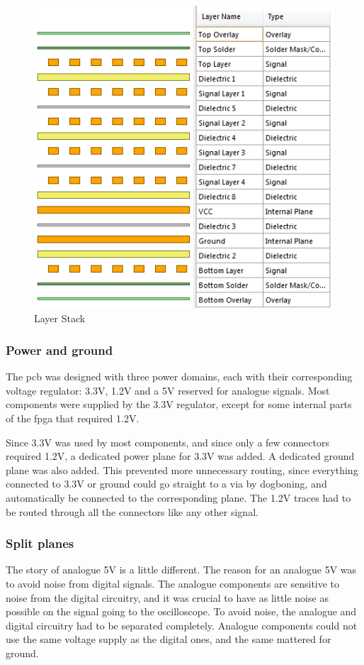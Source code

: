 \begin{figure}[h!]
\centering
\includegraphics[scale = 0.8]{images/Layers.png}
\caption{Layer Stack}
\label{fig:Layers}
\end{figure}

\subsubsection{Power and ground}
\label{Power}
The \gls{pcb} was designed with three power domains, each with their corresponding voltage regulator: 3.3V, 1.2V and a 5V reserved for analogue signals.
Most components were supplied by the 3.3V regulator, except for some internal parts of the \gls{fpga} that required 1.2V.

Since 3.3V was used by most components, and since only a few connectors required 1.2V, a dedicated power plane for 3.3V was added.
A dedicated ground plane was also added.
This prevented more unnecessary routing, since everything connected to 3.3V or ground could go straight to a via by dogboning, and automatically be connected to the corresponding plane.
The 1.2V traces had to be routed through all the connectors like any other signal.

\subsubsection{Split planes}
The story of analogue 5V is a little different.
The reason for an analogue 5V was to avoid noise from digital signals.
The analogue components are sensitive to noise from the digital circuitry, and it was crucial to have as little noise as possible on the signal going to the oscilloscope.
To avoid noise, the analogue and digital circuitry had to be separated completely.
Analogue components could not use the same voltage supply as the digital ones, and the same mattered for ground.

